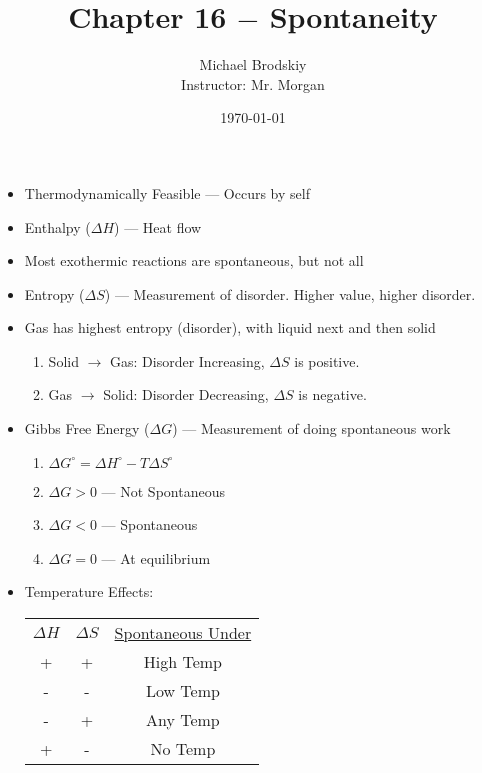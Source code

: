 \documentclass[12pt]{article}
\title{Chapter 16 $-$ Spontaneity}
\date{\today}
\author{Michael Brodskiy\\ \small Instructor: Mr. Morgan}
\begin{document}
\maketitle

\begin{itemize}

  \item Thermodynamically Feasible — Occurs by self

  \item Enthalpy ($\Delta H$) — Heat flow

  \item Most exothermic reactions are spontaneous, but not all

  \item Entropy ($\Delta S$) — Measurement of disorder. Higher value, higher disorder.

  \item Gas has highest entropy (disorder), with liquid next and then solid

    \begin{enumerate}

      \item Solid $\rightarrow$ Gas: Disorder Increasing, $\Delta S$ is positive.

      \item Gas $\rightarrow$ Solid: Disorder Decreasing, $\Delta S$ is negative.

    \end{enumerate}

  \item Gibbs Free Energy ($\Delta G$) — Measurement of doing spontaneous work

    \begin{enumerate}

      \item $\Delta G^{\circ}=\Delta H^{\circ} -T\Delta S^{\circ}$

      \item $\Delta G > 0$ — Not Spontaneous

      \item $\Delta G < 0$ — Spontaneous

      \item $\Delta G = 0$ — At equilibrium

    \end{enumerate}

  \item Temperature Effects:

    \begin{center}
      \begin{tabular}{c c c}
        \underline{$\Delta H$} & \underline{$\Delta S$} & \underline{Spontaneous Under}\\
        + & + & High Temp\\
        - & - & Low Temp\\
        - & + & Any Temp\\
        + & - & No Temp\\
      \end{tabular}
    \end{center}


\end{itemize}
\end{document}
